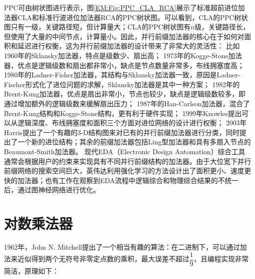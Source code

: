 PPC可由树状图进行表示，图\ref{EM:Fig:PPC_CLA_RCA}展示了标准超前进位加法器CLA和标准行波进位加法器RCA的PPC树状图。可以看到，CLA的PPC树状图只有一级，关键路径短，但计算量大；CLA的PPC树状图有$n$级，关键路径长，但使用了大量的中间节点，计算量小。因此，并行前缀加法器的核心在于如何对面积和延迟进行权衡，这为并行前缀加法器的设计带来了非常大的灵活性\cite{EM:PPA_PPT}：
比如1960年的Sklansky加法器\cite{EM:Sklansky_adder}，特点是级数少、扇出高；
1973年的Kogge-Stone加法器\cite{EM:Kogge-Stone_adder}，优点是逻辑级数和扇出都非常小，缺点是节点数量非常多，布线拥塞度高；
1980年的Ladner-Fisher加法器\cite{EM:Ladner-Fisher_adder}，其结构与Sklansky加法器\cite{EM:Sklansky_adder}一致，原因是Ladner-Fischer形式化了进位问题的求解，Sklansky加法器是其中一种方案；
1982年的Brent-Kung加法器\cite{EM:Brent-Kung_adder}，优点是扇出非常小，节点也较少，缺点是逻辑级数较多，即通过增加额外的逻辑级数来缓解扇出压力；
1987年的Han-Carlson加法器\cite{EM:Han-Carlson_adder}，混合了Brent-Kung结构和Kogge-Stone结构，更有利于硬件实现；
1999年Knowles提出可以从逻辑深度、布线拥塞度和面积三个方面对进位网络的设计进行权衡\cite{EM:S-Knowles_adder}；
2003年Harris提出了一个有趣的3-D结构图来对已有的并行前缀加法器进行分类\cite{EM:Harris_3-D}，同时提出了一个新的进位结构；其余的前缀加法器包括Ling型加法器\cite{EM:Ling_adder}和具有多扇入节点的Beaumont-Smith加法器\cite{EM:Beaumont-Smith_adder}。
现代EDA（Electronic Design Automation）综合工具通常会根据用户的约束来实现具有不同并行前缀结构的加法器。由于大位宽下并行前缀网络的搜索空间巨大，英伟达利用强化学习的方法设计出了面积更小、速度更快的加法器\cite{EM:PrefixRL}；也有工作在观察到EDA流程中逻辑综合和物理综合结果的不统一后\cite{EM:PPA_Pareto}，通过图神经网络进行优化\cite{EM:PPA_GNN}。

\section{对数乘法器} \label{对数乘法器}

1962年，John N. Mitchell提出了一个相当有趣的算法\cite{EM:mitchell}：在二进制下，可以通过加法来近似得到两个无符号非零定点数的乘积，最大误差不超过$\dfrac{1}{9}$，且编程实现非常简洁，原理如下：


